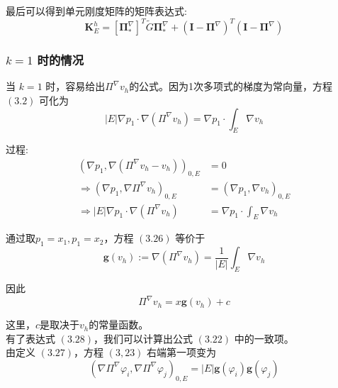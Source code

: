 最后可以得到单元刚度矩阵的矩阵表达式: \\
\begin{equation}
\mathbf K_E^h = [\boldsymbol \Pi^\nabla_{*}]^T \tilde{G} \boldsymbol \Pi_{*}^\nabla + (\mathbf I - \boldsymbol \Pi^\nabla)^T(\mathbf I - \boldsymbol \Pi^\nabla)
\end{equation}


\subsubsection{$k = 1$ 时的情况}

当 $k=1$ 时，容易给出$\Pi^{\nabla} v_h$的公式。因为1次多项式的梯度为常向量，方程 $(3.2)$ 可化为 \\
\begin{equation}
|E| \nabla p_1 \cdot \nabla(\Pi^{\nabla}v_h) = \nabla p_1 \cdot \int_E \nabla v_h
\end{equation}

过程: \\
\begin{equation*}
\begin{aligned}
(\nabla p_1, \nabla(\Pi^\nabla v_h - v_h))_{0,E} & = 0 \\
\Rightarrow
(\nabla p_1, \nabla\Pi^\nabla v_h)_{0,E} & = (\nabla p_1, \nabla v_h)_{0,E} \\
\Rightarrow
|E| \nabla p_1 \cdot \nabla(\Pi^{\nabla}v_h) & = \nabla p_1 \cdot \int_E \nabla v_h
\end{aligned}
\end{equation*}

通过取$p_1 = x_1,p_1 =x_2$，方程 $(3.26)$ 等价于 \\
\begin{equation}
\mathbf g(v_h) := \nabla(\Pi^{\nabla} v_h) = \frac{1}{|E|} \int_E \nabla v_h
\end{equation}

因此 \\
\begin{equation}
\Pi^{\nabla} v_h = x\mathbf g(v_h) + c
\end{equation}

这里，$c$是取决于$v_h$的常量函数。\\

有了表达式 $(3.28)$，我们可以计算出公式 $(3.22)$ 中的一致项。\\

由定义 $(3.27)$，方程 $(3,23)$ 右端第一项变为 \\
\begin{equation*}
(\nabla\Pi^{\nabla} \varphi_i,\nabla\Pi^{\nabla} \varphi_j)_{0,E}=|E|\mathbf g(\varphi_i)\mathbf g(\varphi_j)
\end{equation*}

